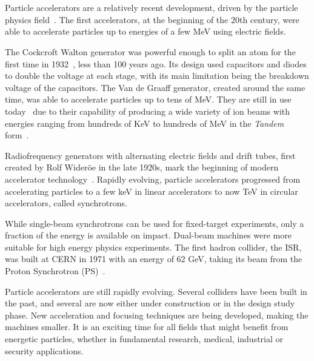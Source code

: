 \section{}

Particle accelerators are a relatively recent development, driven by the particle physics
field~\cite{bryant_brief_1994}. The first accelerators, at the beginning of the 20th century, were
able to accelerate particles up to energies of a few MeV using electric fields.

The Cockcroft Walton generator was powerful enough to split an atom for the first time in
1932~\cite{poole_cockcrofts_2007}, less than 100 years ago. Its design used capacitors and diodes
to double the voltage at each stage, with its main limitation being the breakdown voltage of the
capacitors. The Van de Graaff generator, created around the same time, was able to accelerate
particles up to tens of MeV. They are still in use today~\cite{lebois_rapport_2020} due to their
capability of producing a wide variety of ion beams with energies ranging from hundreds of KeV to
hundreds of MeV in the \textit{Tandem} form~\cite{hinterberger_electrostatic_2006}.

Radiofrequency generators with alternating electric fields and drift tubes, first created by 
Rolf Wideröe in the late 1920s, mark the beginning of modern accelerator
technology~\cite{vretenar_radio_2011}. Rapidly evolving, particle accelerators progressed from
accelerating particles to a few keV in linear accelerators to now TeV in circular accelerators,
called synchrotrons.

While single-beam synchrotrons can be used for fixed-target experiments, only a fraction of the
energy is available on impact. Dual-beam machines were more suitable for high energy physics
experiments. The first hadron collider, the ISR, was built at CERN in 1971 with an energy
of 62 GeV, taking its beam from the Proton Synchrotron (PS)~\cite{philip_cerns_2011}. 

Particle accelerators are still rapidly evolving. Several colliders have been built in the past, and
several are now either under construction or in the design study phase. New acceleration and
focusing techniques are being developed, making the machines smaller. It is an exciting time for all
fields that might benefit from energetic particles, whether in fundamental research, medical,
industrial or security applications.


